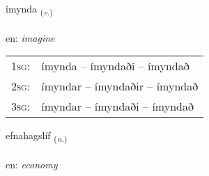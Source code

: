 \documentclass[frontgrid, backgrid]{flacards}\usepackage[]{graphicx}\usepackage[]{color}
\begin{document}
\renewcommand{\flhead}{\vskip5pt \fboxsep=0pt {\small\bfseries\footnotesize Sagnorð | Verb}}
\renewcommand{\fcfoot}{\vskip5pt \fboxsep=0pt \hspace{2pt}{\small\bfseries\footnotesize 2K}}

\renewcommand{\blhead}{\vskip5pt {\small\bfseries\footnotesize Sagnorð | Verb }}
\renewcommand{\bcfoot}{\vskip5pt \hspace{2pt}{\small\bfseries\footnotesize 2K}}


{ímynda \small{\textsubscript{(\textit{v.})}} \\[1ex] %
\textphonetic{[iːmɪnta]} \\
en: \emph{imagine} \\  [2ex]
\renewcommand*{\arraystretch}{0.8}
\begin{tabular}{p{1cm}l}
\textsc{1sg}: & ímynda -- ímyndaði -- ímyndað \\ 
\textsc{2sg}: & ímyndar -- ímyndaðir -- ímyndað \\ 
\textsc{3sg}: & ímyndar -- ímyndaði -- ímyndað \\ 
\end{tabular}
}

\renewcommand{\flhead}{\vskip5pt \fboxsep=0pt {\small\bfseries\footnotesize Nafnorð | Noun}}
\renewcommand{\fcfoot}{\vskip5pt \fboxsep=0pt \hspace{2pt}{\small\bfseries\footnotesize 2K}}

\renewcommand{\blhead}{\vskip5pt {\small\bfseries\footnotesize Nafnorð | Noun }}
\renewcommand{\bcfoot}{\vskip5pt \hspace{2pt}{\small\bfseries\footnotesize 2K}}


{efnahagslíf \small{\textsubscript{(\textit{n.})}} \\[1ex] %
\textphonetic{[ɛpnahaxstliv]} \\
en: \emph{economy} \\  [2ex]
\renewcommand*{\arraystretch}{0.8}
}
\end{document}
